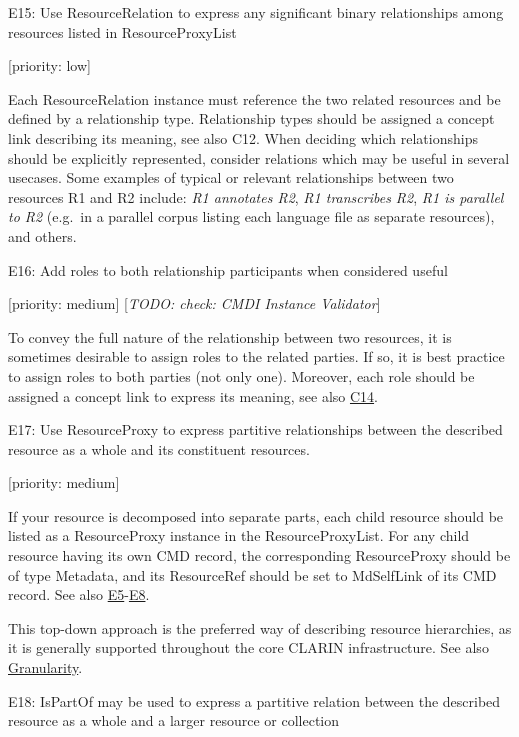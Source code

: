 E15: Use ResourceRelation to express any significant binary
relationships among resources listed in ResourceProxyList

{[}priority: low{]}

Each ResourceRelation instance must reference the two related resources
and be defined by a relationship type. Relationship types should be
assigned a concept link describing its meaning, see also C12. When
deciding which relationships should be explicitly represented, consider
relations which may be useful in several usecases. Some examples of
typical or relevant relationships between two resources R1 and R2
include: \emph{R1 annotates R2}, \emph{R1 transcribes R2}, \emph{R1 is
parallel to R2} (e.g.~in a parallel corpus listing each language file as
separate resources), and others.

E16: Add roles to both relationship participants when considered useful

{[}priority: medium{]} {[}\emph{TODO: check: CMDI Instance Validator}{]}

To convey the full nature of the relationship between two resources, it
is sometimes desirable to assign roles to the related parties. If so, it
is best practice to assign roles to both parties (not only one).
Moreover, each role should be assigned a concept link to express its
meaning, see also
\href{/modelling_component_metadata/components.md\#c14}{C14}.

E17: Use ResourceProxy to express partitive relationships between the
described resource as a whole and its constituent resources.

{[}priority: medium{]}

If your resource is decomposed into separate parts, each child resource
should be listed as a ResourceProxy instance in the ResourceProxyList.
For any child resource having its own CMD record, the corresponding
ResourceProxy should be of type Metadata, and its ResourceRef should be
set to MdSelfLink of its CMD record. See also
\protect\hyperlink{e5-there-should-be-at-least-one-resource-proxy}{E5}-\protect\hyperlink{e8-metadata-type-resource-proxies-should-use-pids}{E8}.

This top-down approach is the preferred way of describing resource
hierarchies, as it is generally supported throughout the core CLARIN
infrastructure. See also
\href{/common_approachesproblems/granularity.md}{Granularity}.

E18: IsPartOf may be used to express a partitive relation between the
described resource as a whole and a larger resource or collection

